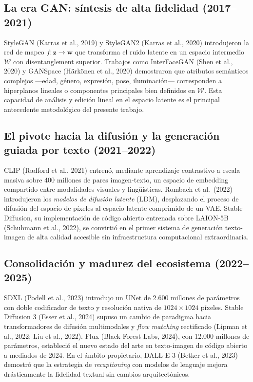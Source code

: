 \documentclass[12pt, a4paper, twoside]{book}
\newcommand{\z}{\mathbf{z}}
\begin{document}
\subsection{La era GAN: síntesis de alta fidelidad (2017--2021)}

StyleGAN (Karras et al., 2019) y StyleGAN2 (Karras et al., 2020) introdujeron la red de mapeo $f: \z \rightarrow \mathbf{w}$ que transforma el ruido latente en un espacio intermedio $\mathcal{W}$ con disentanglement superior. Trabajos como InterFaceGAN (Shen et al., 2020) y GANSpace (Härkönen et al., 2020) demostraron que atributos semánticos complejos ---edad, género, expresión, pose, iluminación--- corresponden a hiperplanos lineales o componentes principales bien definidos en $\mathcal{W}$. Esta capacidad de análisis y edición lineal en el espacio latente es el principal antecedente metodológico del presente trabajo.

\subsection{El pivote hacia la difusión y la generación guiada por texto (2021--2022)}

CLIP (Radford et al., 2021) entrenó, mediante aprendizaje contrastivo a escala masiva sobre 400 millones de pares imagen-texto, un espacio de embedding compartido entre modalidades visuales y lingüísticas. Rombach et al.\ (2022) introdujeron los \textit{modelos de difusión latente} (LDM), desplazando el proceso de difusión del espacio de píxeles al espacio latente comprimido de un VAE. Stable Diffusion, su implementación de código abierto entrenada sobre LAION-5B (Schuhmann et al., 2022), se convirtió en el primer sistema de generación texto-imagen de alta calidad accesible sin infraestructura computacional extraordinaria.

\subsection{Consolidación y madurez del ecosistema (2022--2025)}

SDXL (Podell et al., 2023) introdujo un UNet de 2.600 millones de parámetros con doble codificador de texto y resolución nativa de $1024 \times 1024$ píxeles. Stable Diffusion 3 (Esser et al., 2024) supuso un cambio de paradigma hacia transformadores de difusión multimodales y \textit{flow matching} rectificado (Lipman et al., 2022; Liu et al., 2022). Flux (Black Forest Labs, 2024), con 12.000 millones de parámetros, estableció el nuevo estado del arte en texto-imagen de código abierto a mediados de 2024. En el ámbito propietario, DALL-E 3 (Betker et al., 2023) demostró que la estrategia de \textit{recaptioning} con modelos de lenguaje mejora drásticamente la fidelidad textual sin cambios arquitectónicos.
\end{document}
